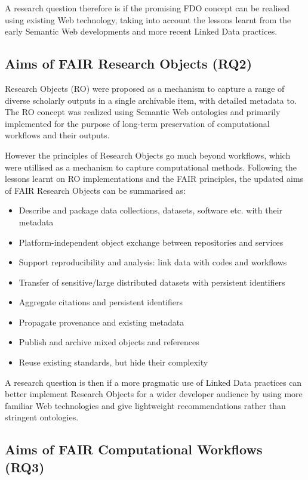 A research question therefore is if the promising FDO concept can be realised using existing Web technology, taking into account the lessons learnt from the early Semantic Web developments and more recent Linked Data practices. 


\subsection{Aims of FAIR Research Objects (RQ2)}

Research Objects (RO) \cite{Bechhofer 2013} were proposed as a mechanism to capture a range of diverse scholarly outputs in a single archivable item, with detailed metadata to. The RO concept was realized using Semantic Web ontologies \cite{Belhajjame 2015} and primarily implemented for the purpose of long-term preservation of computational workflows and their outputs.

However the principles of Research Objects go much beyond workflows, which were utillised as a mechanism to capture computational methods. Following the lessons learnt on RO implementations and the FAIR principles, the updated aims of FAIR Research Objects can be summarised as:

\begin{itemize}
    \item Describe and package data collections, datasets, software etc. with their metadata
    \item Platform-independent object exchange between repositories and services
    \item Support reproducibility and analysis: link data with codes and workflows
    \item Transfer of sensitive/large distributed datasets with persistent identifiers
    \item Aggregate citations and persistent identifiers
    \item Propagate provenance and existing metadata
    \item Publish and archive mixed objects and references
    \item Reuse existing standards, but hide their complexity
\end{itemize}

A research question is then if a more pragmatic use of Linked Data practices can better implement Research Objects for a wider developer audience by using more familiar Web technologies and give lightweight recommendations rather than stringent ontologies.


\subsection{Aims of FAIR Computational Workflows (RQ3)}

